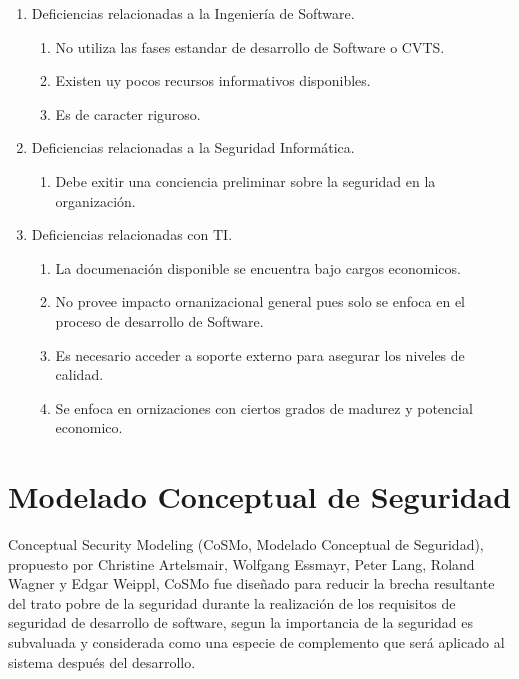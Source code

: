\documentclass[runningheads,a4paper]{llncs}
\begin{document}
\begin{enumerate}
	\item Deficiencias relacionadas a la Ingeniería de \gls{Software}.
		\begin{enumerate}
			\item No utiliza las fases estandar de desarrollo de \gls{Software} o \gls{CVTS}. 
			\item Existen uy pocos recursos informativos disponibles.
			\item Es de caracter riguroso.\\
			
		\end{enumerate}
	\item Deficiencias relacionadas a la Seguridad Informática.
		\begin{enumerate}
			\item Debe exitir una conciencia preliminar sobre la seguridad en la organización.\\
			
		\end{enumerate}
	\item Deficiencias relacionadas con \gls{TI}.
		\begin{enumerate}
			\item La documenación disponible se encuentra bajo cargos economicos.
			\item No provee impacto ornanizacional general pues solo se enfoca en el proceso de desarrollo de \gls{Software}.
			\item Es necesario acceder a soporte externo para asegurar los niveles de calidad.
			\item Se enfoca en ornizaciones con ciertos grados de madurez y potencial economico.
			
		\end{enumerate}
\end{enumerate}


\section{Modelado Conceptual de Seguridad}
Conceptual Security Modeling  (CoSMo, Modelado Conceptual de Seguridad), propuesto por Christine Artelsmair, Wolfgang Essmayr, Peter Lang, Roland Wagner y Edgar Weippl, \gls{CoSMo} fue diseñado para reducir la brecha resultante del trato pobre de la seguridad durante la realización de los requisitos de seguridad de desarrollo de software, segun \cite{CoSMoIntroduction} la importancia de la seguridad es subvaluada y considerada como una especie de complemento que será aplicado al sistema después del desarrollo.
\end{document}
